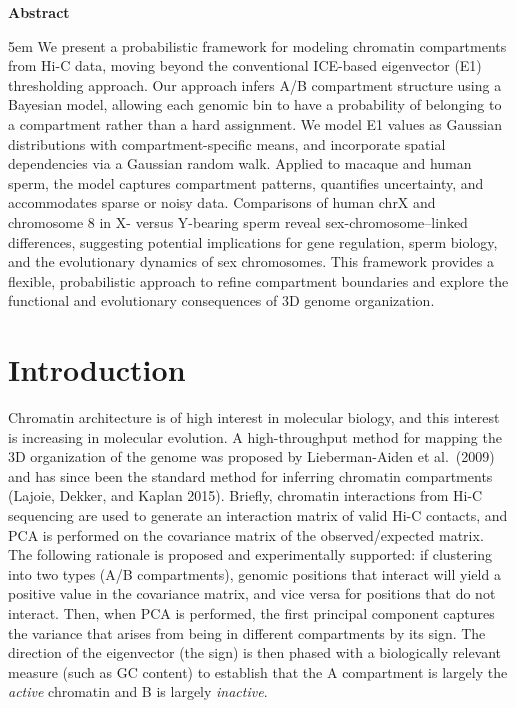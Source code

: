 \documentclass[
  10pt,
  a4paper,
  openany]{scrbook}
\renewcommand*\contentsname{Table of contents}
\newcommand\contentsname{Table of contents}
\begin{document}
\vspace{10ex}
{\center\bfseries\Large Abstract \par}
{
\begin{addmargin}[5em]{5em}
{We present a probabilistic framework for modeling chromatin
compartments from Hi-C data, moving beyond the conventional ICE-based
eigenvector (E1) thresholding approach. Our approach infers A/B
compartment structure using a Bayesian model, allowing each genomic bin
to have a probability of belonging to a compartment rather than a hard
assignment. We model E1 values as Gaussian distributions with
compartment-specific means, and incorporate spatial dependencies via a
Gaussian random walk. Applied to macaque and human sperm, the model
captures compartment patterns, quantifies uncertainty, and accommodates
sparse or noisy data. Comparisons of human chrX and chromosome 8 in X-
versus Y-bearing sperm reveal sex-chromosome--linked differences,
suggesting potential implications for gene regulation, sperm biology,
and the evolutionary dynamics of sex chromosomes. This framework
provides a flexible, probabilistic approach to refine compartment
boundaries and explore the functional and evolutionary consequences of
3D genome organization.}
\end{addmargin}
}

\renewcommand*\contentsname{Table of contents}
{
\setcounter{tocdepth}{1}
\tableofcontents
}

\mainmatter
\chapter{Introduction}\label{introduction}

Chromatin architecture is of high interest in molecular biology, and
this interest is increasing in molecular evolution. A high-throughput
method for mapping the 3D organization of the genome was proposed by
Lieberman-Aiden et al.~(2009) and has since been the standard method for
inferring chromatin compartments (Lajoie, Dekker, and Kaplan 2015).
Briefly, chromatin interactions from Hi-C sequencing are used to
generate an interaction matrix of valid Hi-C contacts, and PCA is
performed on the covariance matrix of the observed/expected matrix. The
following rationale is proposed and experimentally supported: if
clustering into two types (A/B compartments), genomic positions that
interact will yield a positive value in the covariance matrix, and vice
versa for positions that do not interact. Then, when PCA is performed,
the first principal component captures the variance that arises from
being in different compartments by its sign. The direction of the
eigenvector (the sign) is then phased with a biologically relevant
measure (such as GC content) to establish that the A compartment is
largely the \emph{active} chromatin and B is largely \emph{inactive}.
\end{document}
